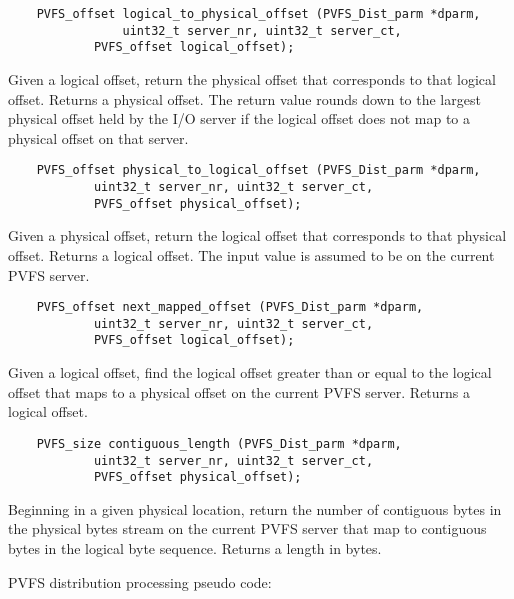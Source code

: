\documentclass[11pt]{article}
\begin{document}
\begin{verbatim}
   	PVFS_offset logical_to_physical_offset (PVFS_Dist_parm *dparm,
        		uint32_t server_nr, uint32_t server_ct,
         	PVFS_offset logical_offset);
\end{verbatim}

Given a logical offset, return the physical offset that corresponds to
that logical offset.  Returns a physical offset.  The return value rounds 
down to the largest physical offset held by the I/O server if the 
logical offset does not map to a physical offset on that server.

\begin{verbatim}
   	PVFS_offset physical_to_logical_offset (PVFS_Dist_parm *dparm,
         	uint32_t server_nr, uint32_t server_ct,
         	PVFS_offset physical_offset);
\end{verbatim}

Given a physical offset, return the logical offset that corresponds to
that physical offset.  Returns a logical offset.  The input value is
assumed to be on the current PVFS server.

\begin{verbatim}
   	PVFS_offset next_mapped_offset (PVFS_Dist_parm *dparm,
         	uint32_t server_nr, uint32_t server_ct,
         	PVFS_offset logical_offset);
\end{verbatim}

Given a logical offset, find the logical offset greater than or equal
to the logical offset that maps to a physical offset on the current
PVFS server.  Returns a logical offset.

\begin{verbatim}
   	PVFS_size contiguous_length (PVFS_Dist_parm *dparm,
         	uint32_t server_nr, uint32_t server_ct,
         	PVFS_offset physical_offset);
\end{verbatim}

Beginning in a given physical location, return the number of contiguous
bytes in the physical bytes stream on the current PVFS server that map
to contiguous bytes in the logical byte sequence.  Returns a length in bytes.

PVFS distribution processing pseudo code:
\end{document}
